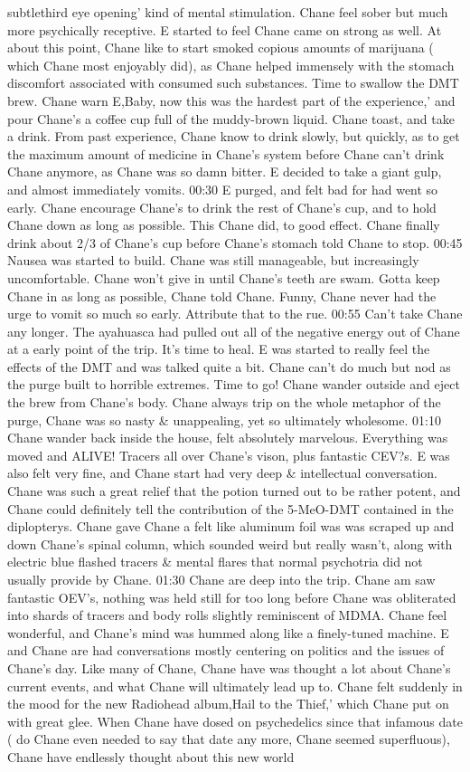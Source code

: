 \documentclass[12pt]{book}
\begin{document}
subtlethird eye opening' kind of mental stimulation. Chane feel sober but much more psychically receptive. E started to feel Chane came on strong as well. At about this point, Chane like to start smoked copious amounts of marijuana ( which Chane most enjoyably did), as Chane helped immensely with the stomach discomfort associated with consumed such substances. Time to swallow the DMT brew. Chane warn E,Baby, now this was the hardest part of the experience,' and pour Chane's a coffee cup full of the muddy-brown liquid. Chane toast, and take a drink. From past experience, Chane know to drink slowly, but quickly, as to get the maximum amount of medicine in Chane's system before Chane can't drink Chane anymore, as Chane was so damn bitter. E decided to take a giant gulp, and almost immediately vomits. 00:30 E purged, and felt bad for had went so early. Chane encourage Chane's to drink the rest of Chane's cup, and to hold Chane down as long as possible. This Chane did, to good effect. Chane finally drink about 2/3 of Chane's cup before Chane's stomach told Chane to stop. 00:45 Nausea was started to build. Chane was still manageable, but increasingly uncomfortable. Chane won't give in until Chane's teeth are swam. Gotta keep Chane in as long as possible, Chane told Chane. Funny, Chane never had the urge to vomit so much so early. Attribute that to the rue. 00:55 Can't take Chane any longer. The ayahuasca had pulled out all of the negative energy out of Chane at a early point of the trip. It's time to heal. E was started to really feel the effects of the DMT and was talked quite a bit. Chane can't do much but nod as the purge built to horrible extremes. Time to go! Chane wander outside and eject the brew from Chane's body. Chane always trip on the whole metaphor of the purge, Chane was so nasty \& unappealing, yet so ultimately wholesome. 01:10 Chane wander back inside the house, felt absolutely marvelous. Everything was moved and ALIVE! Tracers all over Chane's vison, plus fantastic CEV?s. E was also felt very fine, and Chane start had very deep \& intellectual conversation. Chane was such a great relief that the potion turned out to be rather potent, and Chane could definitely tell the contribution of the 5-MeO-DMT contained in the diplopterys. Chane gave Chane a felt like aluminum foil was was scraped up and down Chane's spinal column, which sounded weird but really wasn't, along with electric blue flashed tracers \& mental flares that normal psychotria did not usually provide by Chane. 01:30 Chane are deep into the trip. Chane am saw fantastic OEV's, nothing was held still for too long before Chane was obliterated into shards of tracers and body rolls slightly reminiscent of MDMA. Chane feel wonderful, and Chane's mind was hummed along like a finely-tuned machine. E and Chane are had conversations mostly centering on politics and the issues of Chane's day. Like many of Chane, Chane have was thought a lot about Chane's current events, and what Chane will ultimately lead up to. Chane felt suddenly in the mood for the new Radiohead album,Hail to the Thief,' which Chane put on with great glee. When Chane have dosed on psychedelics since that infamous date ( do Chane even needed to say that date any more, Chane seemed superfluous), Chane have endlessly thought about this new world 
\end{document}
